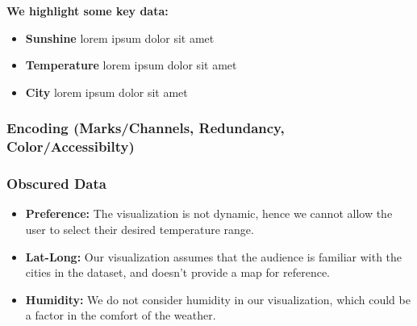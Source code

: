 \documentclass{article}
\begin{document}
\textbf{We highlight some key data:}
\begin{itemize}
    \item \textbf{Sunshine} lorem ipsum dolor sit amet  
    \item \textbf{Temperature} lorem ipsum dolor sit amet
    \item \textbf{City} lorem ipsum dolor sit amet
\end{itemize}

\subsubsection{Encoding (Marks/Channels, Redundancy, Color/Accessibilty)}
\subsubsection{Obscured Data}
    \begin{itemize}
        \item \textbf{Preference:} The visualization is not dynamic, hence we cannot allow the user to select their desired temperature range.
        \item \textbf{Lat-Long:} Our visualization assumes that the audience is familiar with the cities in the dataset, and doesn't provide a map for reference.
        \item \textbf{Humidity:} We do not consider humidity in our visualization, which could be a factor in the comfort of the weather.
    \end{itemize}



\end{document}
